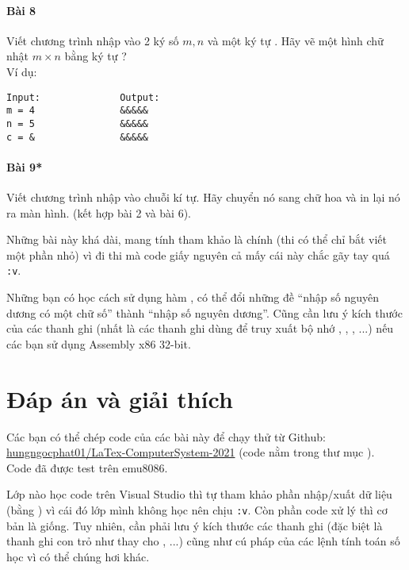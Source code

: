 \documentclass[main.tex]{subfiles}
\begin{document}
\paragraph{Bài 8} Viết chương trình nhập vào 2 ký số $m, n$ và một ký tự . Hãy vẽ một hình chữ nhật $m\times n$ bằng ký tự ?\\
Ví dụ:
\begin{verbatim}
Input:              Output:
m = 4               &&&&&               
n = 5               &&&&& 
c = &               &&&&&
\end{verbatim}

\paragraph{Bài 9*} Viết chương trình nhập vào chuỗi kí tự. Hãy chuyển nó sang chữ hoa và in lại nó ra màn hình. (kết hợp bài 2 và bài 6).\bigskip

Những bài này khá dài, mang tính tham khảo là chính (thi có thể chỉ bắt viết một phần nhỏ) vì đi thi mà code giấy nguyên cả mấy cái này chắc gãy tay quá \verb#:v#.\bigskip

Những bạn có học cách sử dụng hàm ,  có thể đổi những đề ``nhập số nguyên dương có một chữ số'' thành ``nhập số nguyên dương''. Cũng cần lưu ý kích thước của các thanh ghi (nhất là các thanh ghi dùng để truy xuất bộ nhớ , , , ...) nếu các bạn sử dụng Assembly x86 32-bit. 
\pagebreak

\section{Đáp án và giải thích}
Các bạn có thể chép code của các bài này để chạy thử từ Github: \href{https://github.com/hungngocphat01/LaTex-ComputerSystem-2021}{hungngocphat01/LaTex-ComputerSystem-2021} (code nằm trong thư mục ).\\
Code đã được test trên emu8086.\bigskip

Lớp nào học code trên Visual Studio thì tự tham khảo phần nhập/xuất dữ liệu (bằng ) vì cái đó lớp mình không học nên chịu \verb#:v#. Còn phần code xử lý thì cơ bản là giống. Tuy nhiên, cần phải lưu ý kích thước các thanh ghi (đặc biệt là thanh ghi con trỏ như  thay cho , ...) cũng như cú pháp của các lệnh tính toán số học vì có thể chúng hơi khác.
\renewcommand{\fcolorbox}[4][]{#4}
\end{document}
